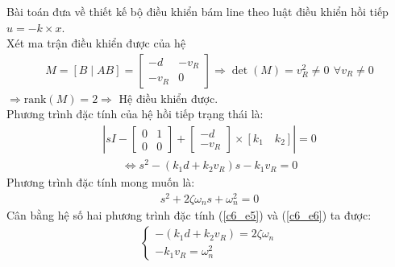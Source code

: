           \hspace*{0.6cm}Bài toán đưa về thiết kế bộ điều khiển bám line theo luật điều khiển hồi tiếp $u = -k \times x$.\\
          \hspace*{0.6cm}Xét ma trận điều khiển được của hệ
          \begin{align}
               M = [B \mid AB] = \begin{bmatrix}
               -d & -v_R \\
               -v_R & 0
          \end{bmatrix} \Rightarrow \det(M) = v_R^2 \neq 0 \,\ \forall v_R \neq 0
          \end{align}
          \hspace*{0.6cm}$\Rightarrow \text{rank}(M) = 2 \Rightarrow$ Hệ điều khiển được. \\
          \hspace*{0.6cm}Phương trình đặc tính của hệ hồi tiếp trạng thái là:
          \begin{align*}
               \left|sI - \begin{bmatrix} 0 & 1 \\ 0 & 0 \end{bmatrix} + \begin{bmatrix} -d \\ -v_R \end{bmatrix} \times [k_1 \quad k_2]\right| = 0
          \end{align*}
          \begin{align}
               \Leftrightarrow s^2 - (k_1d + k_2v_R)s - k_1v_R = 0
               \label{c6_e5}
          \end{align}
          \hspace*{0.6cm}Phương trình đặc tính mong muốn là:
          \begin{align}
               s^2 + 2\zeta\omega_ns + \omega_n^2 = 0 
               \label{c6_e6}
          \end{align}
          \hspace*{0.6cm}Cân bằng hệ số hai phương trình đặc tính (\ref{c6_e5}) và (\ref{c6_e6}) ta được:
          \begin{align*}
               \begin{cases}
               - (k_1d + k_2v_R) = 2\zeta\omega_n \\
               - k_1v_R = \omega_n^2
               \end{cases} 
          \end{align*}
